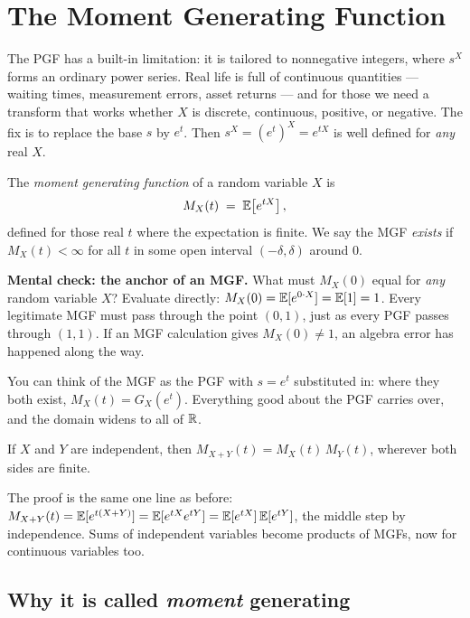 \section{The Moment Generating Function}
\label{ch18:mgf}

The PGF has a built-in limitation: it is tailored to nonnegative integers,
where $s^X$ forms an ordinary power series. Real life is full of continuous
quantities --- waiting times, measurement errors, asset returns --- and for
those we need a transform that works whether $X$ is discrete, continuous,
positive, or negative. The fix is to replace the base $s$ by $e^t$. Then
$s^X = (e^t)^X = e^{tX}$ is well defined for \emph{any} real $X$.

\begin{definition}
\label{ch18:def-mgf}
The \emph{moment generating function} of a random variable $X$ is
\[
  M_X(t) \;=\; \operatorname{\mathbb{E}}\!\left[e^{tX}\right],
\]
defined for those real $t$ where the expectation is finite. We say the MGF
\emph{exists} if $M_X(t)<\infty$ for all $t$ in some open interval
$(-\delta,\delta)$ around $0$.
\end{definition}

\begin{recoverybox}
\textbf{Mental check: the anchor of an MGF.}
What must $M_X(0)$ equal for \emph{any} random variable $X$?
Evaluate directly: $M_X(0) = \operatorname{\mathbb{E}}[e^{0\cdot X}] = \operatorname{\mathbb{E}}[1] = 1$.
Every legitimate MGF must pass through the point $(0,1)$, just as every PGF passes through $(1,1)$. If an MGF calculation gives $M_X(0) \ne 1$, an algebra error has happened along the way.
\end{recoverybox}

You can think of the MGF as the PGF with $s=e^t$ substituted in: where they both
exist, $M_X(t)=G_X(e^t)$. Everything good about the PGF carries over, and the
domain widens to all of $\mathbb{R}$.

\begin{theorem}
\label{ch18:thm-mgf-product}
If $X$ and $Y$ are independent, then $M_{X+Y}(t)=M_X(t)\,M_Y(t)$, wherever both
sides are finite.
\end{theorem}

The proof is the same one line as before:
$M_{X+Y}(t)=\operatorname{\mathbb{E}}[e^{t(X+Y)}]=\operatorname{\mathbb{E}}[e^{tX}e^{tY}]=\operatorname{\mathbb{E}}[e^{tX}]\operatorname{\mathbb{E}}[e^{tY}]$, the middle
step by independence. Sums of independent variables become products of MGFs,
now for continuous variables too.

\subsection{Why it is called \emph{moment} generating}

